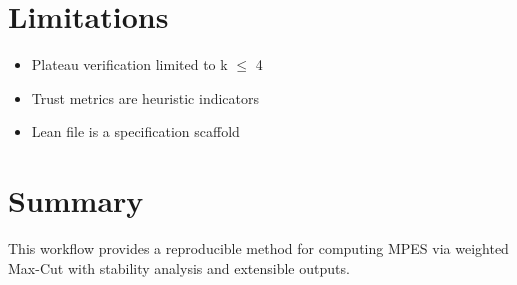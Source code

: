 \documentclass[11pt]{article}
\begin{document}
\section{Limitations}

\begin{itemize}
\item Plateau verification limited to k $\leq$ 4
\item Trust metrics are heuristic indicators
\item Lean file is a specification scaffold
\end{itemize}

\section{Summary}

This workflow provides a reproducible method for computing MPES via weighted Max-Cut with stability analysis and extensible outputs.
\end{document}
